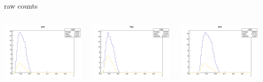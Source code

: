 \begin{frame}{raw counts}
\begin{columns}
\begin{column}[T]{0.25\textwidth}
\includegraphics[width = \textwidth]{results/yield/statistics/yield_x_Q2_z_0.45_4.750_0.40_pos.png}
\end{column}
\begin{column}[T]{0.25\textwidth}
\includegraphics[width = \textwidth]{results/yield/statistics/yield_x_Q2_z_0.45_4.750_0.40_neg.png}
\end{column}
\begin{column}[T]{0.25\textwidth}
\includegraphics[width = \textwidth]{results/yield/statistics/yield_x_Q2_z_0.45_4.750_0.50_pos.png}

\end{column}
\end{columns}
\end{frame}
